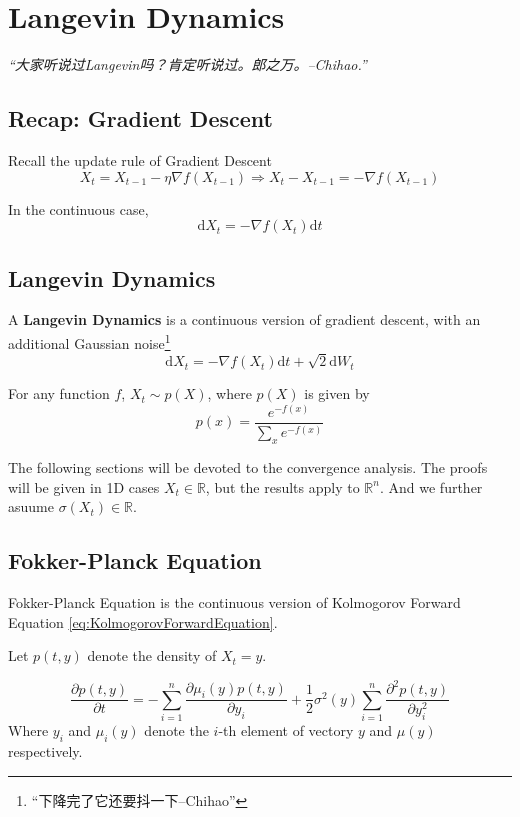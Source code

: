 \section{Langevin Dynamics}
    \emph{“大家听说过Langevin吗？肯定听说过。郎之万。--Chihao.”}
    \subsection{Recap: Gradient Descent}
        Recall the update rule of Gradient Descent
        \[ X_t = X_{t-1} - \eta\nabla f(X_{t-1}) \Longrightarrow X_t - X_{t-1} = -\nabla f(X_{t-1})\]

        In the continuous case,
        \[ \mathrm{d}X_t = -\nabla f(X_t)\mathrm{d}t \]

    \subsection{Langevin Dynamics}
        A \textbf{Langevin Dynamics} is a continuous version of gradient descent, with an additional Gaussian noise\footnote{“下降完了它还要抖一下--Chihao”}
        \[ \mathrm{d}X_t = -\nabla f(X_t)\mathrm{d}t + \sqrt{2}\mathrm{d}W_t \]

        \begin{theorem}\label{thm:ConvergenceOfLangevinDynamics}
            For any function $f$, $X_t \sim p(X)$, where $p(X)$ is given by
            \[ p(x) = \frac{e^{-f(x)}}{\sum_x e^{-f(x)}} \]
        \end{theorem}

        The following sections will be devoted to the convergence analysis. The proofs will be given in 1D cases $X_t \in \mathbb{R}$, but the results apply to $\mathbb{R}^n$. And we further asuume $\sigma(X_t) \in \mathbb{R}$.

    \subsection{Fokker-Planck Equation}
        Fokker-Planck Equation is the continuous version of Kolmogorov Forward Equation \ref{eq:KolmogorovForwardEquation}.

        Let $p(t,y)$ denote the density of $X_t = y$.

        \begin{equation}\label{eq:Fokker-PlanckEquation}
            \frac{\partial p(t,y)}{\partial t} = - \sum_{i=1}^n \frac{\partial \mu_i(y)p(t,y)}{\partial y_i} + \frac{1}{2}\sigma^2(y)\sum_{i=1}^n\frac{\partial^2 p(t,y)}{\partial y_i^2}
        \end{equation}
        Where $y_i$ and $\mu_i(y)$ denote the $i$-th element of vectory $y$ and $\mu(y)$ respectively.

